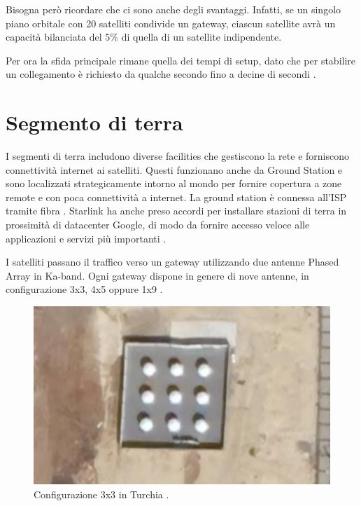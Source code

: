 Bisogna però ricordare che ci sono anche degli svantaggi.
Infatti, se un singolo piano orbitale con 20 satelliti condivide un gateway, ciascun satellite avrà un capacità bilanciata del $5\%$ di quella di un satellite indipendente.

Per ora la sfida principale rimane quella dei tempi di setup, dato che per stabilire un collegamento è richiesto da qualche secondo fino a decine di secondi \cite{chaudhry_laser_2021}.

\section{Segmento di terra}
I segmenti di terra includono diverse facilities che gestiscono la rete e forniscono connettività internet ai satelliti. Questi funzionano anche da Ground Station e sono localizzati strategicamente intorno al mondo per fornire copertura a zone remote e con poca connettività a internet.
La ground station è connessa all'\ac{ISP} tramite fibra \cite{branch_education_how_2022}.
Starlink ha anche preso accordi per installare stazioni di terra in prossimità di datacenter Google, di modo da fornire accesso veloce alle applicazioni e servizi più importanti \cite{jason_rainbow_starlink_2021}.

I satelliti passano il traffico verso un gateway utilizzando due antenne Phased Array in \ac{Ka}-band. Ogni gateway dispone in genere di nove antenne, in configurazione 3x3, 4x5 oppure 1x9 \cite{mike_puchol_modeling_2022}.

\begin{figure}[htbp]
  \centering
  \includegraphics[width=0.9\linewidth]{./res/img/starlink_gateway.png}
  \caption{Configurazione 3x3 in Turchia \cite{mike_puchol_modeling_2022}.}
  \label{fig:starlink-gateway}
\end{figure}

